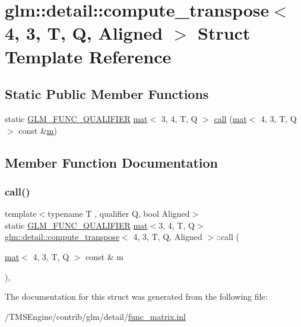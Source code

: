 \hypertarget{structglm_1_1detail_1_1compute__transpose_3_014_00_013_00_01_t_00_01_q_00_01_aligned_01_4}{}\section{glm\+:\+:detail\+:\+:compute\+\_\+transpose$<$ 4, 3, T, Q, Aligned $>$ Struct Template Reference}
\label{structglm_1_1detail_1_1compute__transpose_3_014_00_013_00_01_t_00_01_q_00_01_aligned_01_4}
\subsection*{Static Public Member Functions}
\begin{DoxyCompactItemize}
\item 
static \hyperlink{setup_8hpp_a33fdea6f91c5f834105f7415e2a64407}{G\+L\+M\+\_\+\+F\+U\+N\+C\+\_\+\+Q\+U\+A\+L\+I\+F\+I\+ER} \hyperlink{structglm_1_1mat}{mat}$<$ 3, 4, T, Q $>$ \hyperlink{structglm_1_1detail_1_1compute__transpose_3_014_00_013_00_01_t_00_01_q_00_01_aligned_01_4_a11dcaea9624ba8b9509df70883e0256a}{call} (\hyperlink{structglm_1_1mat}{mat}$<$ 4, 3, T, Q $>$ const \&\hyperlink{_s_d_l__opengl__glext_8h_af593500c283bf1a787a6f947f503a5c2}{m})
\end{DoxyCompactItemize}


\subsection{Member Function Documentation}
\mbox{\label{structglm_1_1detail_1_1compute__transpose_3_014_00_013_00_01_t_00_01_q_00_01_aligned_01_4_a11dcaea9624ba8b9509df70883e0256a}} 
\subsubsection{\texorpdfstring{call()}{call()}}
{\footnotesize\ttfamily template$<$typename T , qualifier Q, bool Aligned$>$ \\
static \hyperlink{setup_8hpp_a33fdea6f91c5f834105f7415e2a64407}{G\+L\+M\+\_\+\+F\+U\+N\+C\+\_\+\+Q\+U\+A\+L\+I\+F\+I\+ER} \hyperlink{structglm_1_1mat}{mat}$<$3, 4, T, Q$>$ \hyperlink{structglm_1_1detail_1_1compute__transpose}{glm\+::detail\+::compute\+\_\+transpose}$<$ 4, 3, T, Q, Aligned $>$\+::call (\begin{DoxyParamCaption}\item[{\hyperlink{structglm_1_1mat}{mat}$<$ 4, 3, T, Q $>$ const \&}]{m }\end{DoxyParamCaption})\hspace{0.3cm}{\ttfamily [inline]}, {\ttfamily [static]}}



The documentation for this struct was generated from the following file\+:\begin{DoxyCompactItemize}
\item 
/\+T\+M\+S\+Engine/contrib/glm/detail/\hyperlink{func__matrix_8inl}{func\+\_\+matrix.\+inl}\end{DoxyCompactItemize}
